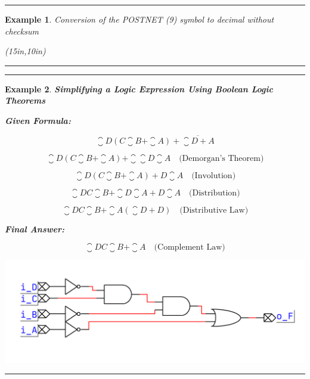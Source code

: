 \documentclass[12pt]{article}
\newtheorem{example}{Example}
\newenvironment{examp}
{\vspace{0.5cm}
\hrule
\begin{example}}
{\hrule
\vspace{0.5cm}
\end{example}}
\begin{document}
\begin{examp}
	Conversion of the POSTNET (9) symbol to decimal without checksum
	\begin{center}
		\begin{pspicture}(15in,10in)
		\end{pspicture}
	\end{center}
\end{examp}

\begin{examp}
	\textbf{Simplifying a Logic Expression Using Boolean Logic Theorems}

	\textbf{Given Formula:}

	\[ \closure{D}(C\closure{B} + \closure{A}) + \overline{\closure{D} + A} \]

	\[ \closure{D}(C\closure{B} + \closure{A}) + \closure{\closure{D}}\closure{A} \quad \text{(Demorgan's Theorem)}\]

	\[ \closure{D}(C\closure{B} + \closure{A}) + D\closure{A}  \quad \text{(Involution)}\]

	\[ \closure{D}C\closure{B} +\closure{D}\closure{A} + D\closure{A}  \quad \text{(Distribution)}\]

	\[ \closure{D}C\closure{B} +\closure{A}(\closure{D}+ D) \quad \text{(Distributive Law)}\]

	\textbf{Final Answer:}

	\[ \closure{D}C\closure{B} +\closure{A} \quad \text{(Complement Law)}\]
	\begin{center}
		\includegraphics[scale=0.3]{lab043}
	\end{center}

\end{examp}
\end{document}
